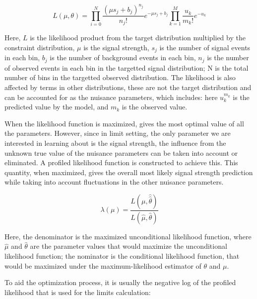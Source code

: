 \begin{equation}
    L(\mu, \theta) =  \prod_{i=0}^{N} \frac{(\mu s_{j} + b_{j})^{n_j}}{n_{j}!}e^{-\mu s_j + b_j} \prod_{k=1}^{M}\frac{u_{k}}
{m_{k}!} e^{-u_{k}}
\label{eq:likelihood}
\end{equation}

Here, $L$ is the likelihood product from the target distribution multiplied by the constraint distribution, $\mu$ is the signal strength, $s_j$ is the number of signal events in each bin, $b_j$ is the number of background events in each bin, $n_j$ is the number of observed events in each bin in the targetted signal distribution; N is the total number of bins in the targetted observed distribution. The likelihood is also affected by terms in other distributions, these
are not the target distribution and can be accounted for as the nuisance parameters, which
includes:
here $u_k^{m_k}$ is the predicted value by the model, and $m_{k}$ is the observed value. 

When the likelihood function is maximized, gives the most optimal value of all the parameters. However, since in limit setting, the only parameter we are interested in learning about is the signal strength, the influence from the unknown true value of the nuisance parameters can be taken into account or eliminated. A profiled likelihood function is constructed to achieve this. This quantity, when maximized, gives the overall most likely signal strength prediction while taking into account fluctuations in the other nuisance parameters. 

\begin{equation}
\lambda(\mu) = \frac{L(\mu, \hat{\hat{\theta}})}{L(\hat{\mu}, \hat{\theta})}
\label{eq:profilelikelihood}
\end{equation}

Here, the denominator is the maximized unconditional likelihood function, where $\hat{\mu}$ and $\hat{\theta}$ are the parameter values that would maximize the unconditional likelihood function; the nominator is the conditional likelihood function, that would be maximized under the maximum-likelihood estimator of $\theta$ and $\mu$. 

To aid the optimization process, it is usually the negative log of the profiled likelihood that is used for the limits calculation:

